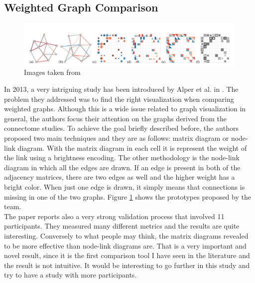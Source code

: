 \documentclass{article}
\begin{document}
\begin{multicols}{2}
\subsection{Weighted Graph Comparison}
\label{subsec:weightedGraph}
\begin{figure}[ht]
\centering
\includegraphics[width = 1.8\columnwidth]{weightedGraphs}
\caption{Images taken from \cite{weightedGraphComparison}}
\label{fig:weightedGraph}
\end{figure}

In 2013, a very intriguing study has been introduced by Alper et al. in \cite{weightedGraphComparison}. The problem they addressed was to find the right visualization when comparing weighted graphs. Although this is a wide issue related to graph visualization in general, the authors focus their attention on the graphs derived from the connectome studies. To achieve the goal briefly described before, the authors proposed two main techniques and they are as follows: matrix diagram or node-link diagram. With the matrix diagram in each cell it is represent the weight of the link using a brightness encoding. The other methodology is the node-link diagram in which all the edges are drawn. If an edge is present in both of the adjacency matrices, there are two edges as well and the higher weight has a bright color. When just one edge is drawn, it simply means that connections is missing in one of the two graphs. Figure \ref{fig:weightedGraph} shows the prototypes proposed by the team.\\
The paper reports also a very strong validation process that involved 11 participants. They measured many different metrics and the results are quite interesting. Conversely to what people may think, the matrix diagrams revealed to be more effective than node-link diagrams are. That is a very important and novel result, since it is the first comparison tool I have seen in the literature and the result is not intuitive. It would be interesting to go further in this study and try to have a study with more participants.\\

\end{multicols}
\end{document}
